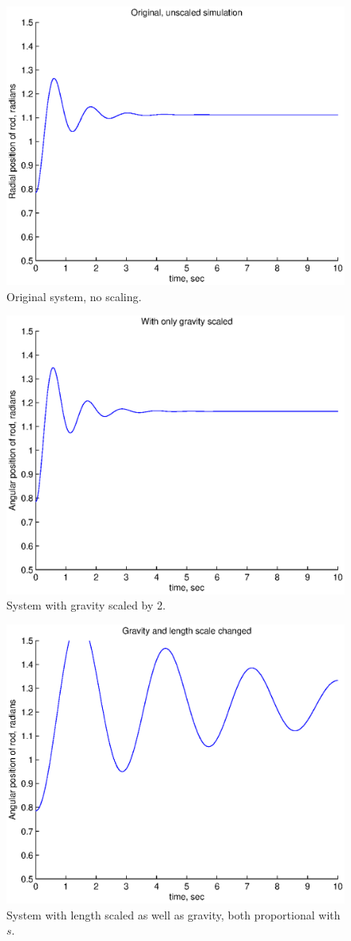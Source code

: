 \documentclass[12pt,letterpaper]{article}
\begin{document}
\begin{figure}[ht]
  \centering
  \includegraphics[width=.48\linewidth]{img/original_angular.eps}
  \caption{Original system, no scaling. }
  \label{fig:original_angular}
\end{figure}

\begin{figure}[ht]
  \centering
  \includegraphics[width=.48\linewidth]{img/grav_only_angular.eps}
  \caption{System with gravity scaled by 2. }
  \label{fig:grav_only_angular}
\end{figure}

\begin{figure}[ht]
  \centering
  \includegraphics[width=.48\linewidth]{img/l_g_angular.eps}
  \caption{System with length scaled as well as gravity, both proportional with $s$. }
  \label{fig:l_g_angular}
\end{figure}
\end{document}
